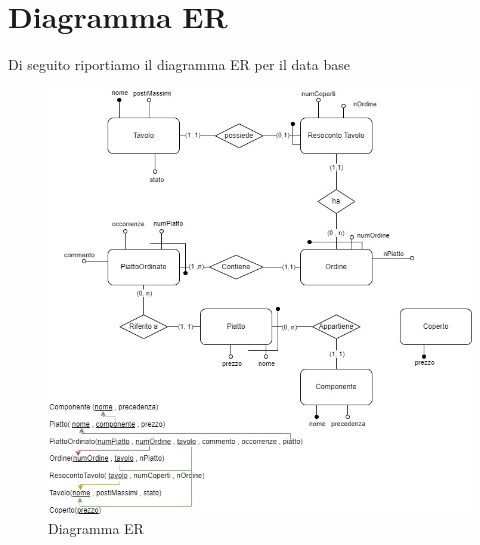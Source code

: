 \documentclass[12pt, letterpaper]{book}
\begin{document}
\section{Diagramma ER}
Di seguito riportiamo il diagramma ER per il data base
\begin{figure}[h]
    \centering
    \includegraphics[width =0.99 \linewidth]{../Diagrammi Data Base/DiagrammaER.jpg}
    \caption{Diagramma ER}
    \label{DB: ER}
\end{figure}
\end{document}

